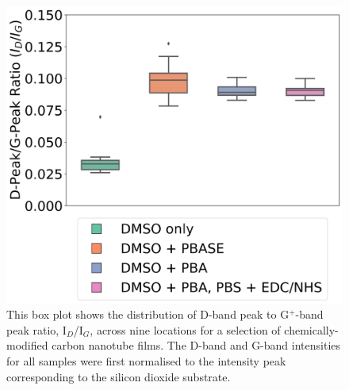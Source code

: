 \documentclass[
  a4paper,
]{scrbook}
\begin{document}
\begin{figure}

{\centering \includegraphics{figures/ch6/comparison_raman.png}

}

\caption{\label{fig-linker-raman}This box plot shows the distribution of
D-band peak to G\(^+\)-band peak ratio, I\(_D\)/I\(_G\), across nine
locations for a selection of chemically-modified carbon nanotube films.
The D-band and G-band intensities for all samples were first normalised
to the intensity peak corresponding to the silicon dioxide substrate.}

\end{figure}
\end{document}
